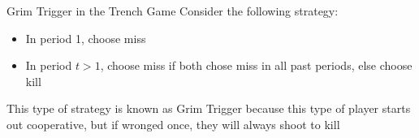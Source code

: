\begin{frame}{Grim Trigger in the Trench Game}
  Consider the following strategy: 
  \begin{itemize}
    \item In period 1, choose miss
    \item In period $t>1$, choose miss if both chose miss in all past periods, else choose kill
  \end{itemize}
  This type of strategy is known as \alert{Grim Trigger} because this type of player starts out cooperative, but if wronged once, they will always shoot to kill
\end{frame}
